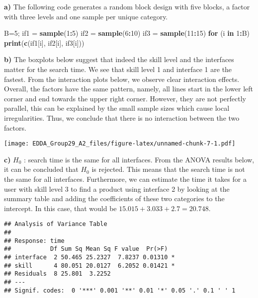 \documentclass[]{article}
\newenvironment{Shaded}{\begin{snugshade}}{\end{snugshade}}
\newcommand{\ControlFlowTok}[1]{\textcolor[rgb]{0.13,0.29,0.53}{\textbf{#1}}}
\newcommand{\DecValTok}[1]{\textcolor[rgb]{0.00,0.00,0.81}{#1}}
\newcommand{\KeywordTok}[1]{\textcolor[rgb]{0.13,0.29,0.53}{\textbf{#1}}}
\newcommand{\NormalTok}[1]{#1}
\newcommand{\OperatorTok}[1]{\textcolor[rgb]{0.81,0.36,0.00}{\textbf{#1}}}
\newcommand{\StringTok}[1]{\textcolor[rgb]{0.31,0.60,0.02}{#1}}
\begin{document}
\textbf{a)} The following code generates a random block design with five
blocks, a factor with three levels and one sample per unique category.

\begin{Shaded}
\begin{Highlighting}[]
\NormalTok{B=}\DecValTok{5}\NormalTok{;}
\NormalTok{if1 =}\StringTok{ }\KeywordTok{sample}\NormalTok{(}\DecValTok{1}\OperatorTok{:}\DecValTok{5}\NormalTok{)}
\NormalTok{if2 =}\StringTok{ }\KeywordTok{sample}\NormalTok{(}\DecValTok{6}\OperatorTok{:}\DecValTok{10}\NormalTok{)}
\NormalTok{if3 =}\StringTok{ }\KeywordTok{sample}\NormalTok{(}\DecValTok{11}\OperatorTok{:}\DecValTok{15}\NormalTok{)}
\ControlFlowTok{for}\NormalTok{ (i }\ControlFlowTok{in} \DecValTok{1}\OperatorTok{:}\NormalTok{B) }\KeywordTok{print}\NormalTok{(}\KeywordTok{c}\NormalTok{(if1[i], if2[i], if3[i]))}
\end{Highlighting}
\end{Shaded}

\textbf{b)} The boxplots below suggest that indeed the skill level and
the interfaces matter for the search time. We see that skill level 1 and
interface 1 are the fastest. From the interaction plots below, we
observe clear interaction effects. Overall, the factors have the same
pattern, namely, all lines start in the lower left corner and end
towards the upper right corner. However, they are not perfectly
parallel, this can be explained by the small sample sizes which cause
local irregularities. Thus, we conclude that there is no interaction
between the two factors.

\texttt{[image: EDDA\_Group29\_A2\_files/figure-latex/unnamed-chunk-7-1.pdf]}

\textbf{c)} \(H_0\) : search time is the same for all interfaces. From
the ANOVA results below, it can be concluded that \(H_0\) is rejected.
This means that the search time is not the same for all interfaces.
Furthermore, we can estimate the time it takes for a user with skill
level 3 to find a product using interface 2 by looking at the summary
table and adding the coefficients of these two categories to the
intercept. In this case, that would be \(15.015+3.033+2.7=20.748\).

\begin{verbatim}
## Analysis of Variance Table
## 
## Response: time
##           Df Sum Sq Mean Sq F value  Pr(>F)  
## interface  2 50.465 25.2327  7.8237 0.01310 *
## skill      4 80.051 20.0127  6.2052 0.01421 *
## Residuals  8 25.801  3.2252                  
## ---
## Signif. codes:  0 '***' 0.001 '**' 0.01 '*' 0.05 '.' 0.1 ' ' 1
\end{verbatim}
\end{document}
